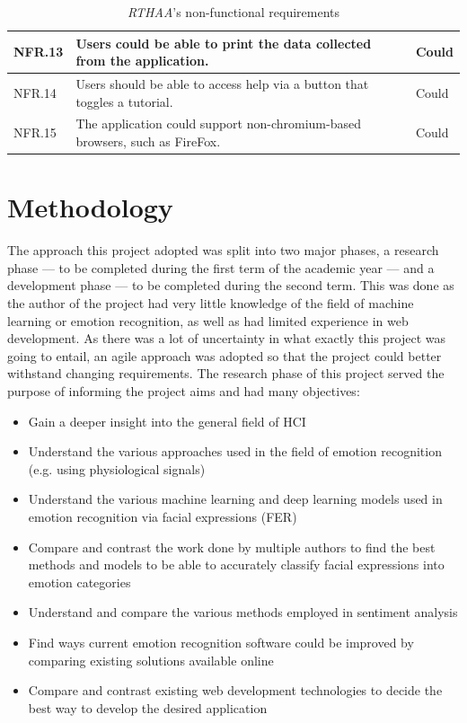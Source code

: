 \documentclass[12pt, a4paper]{article}
\begin{document}
\begin{table}[H]
\begin{tabular}{|L{3.4cm}|L{8.9cm}|L{1.8cm}|}
        \\ \hline
        NFR.13 & Users could be able to print the data collected from the application. & Could
        \\ \hline
        NFR.14 & Users should be able to access help via a button that toggles a tutorial. & Could
        \\ \hline
        NFR.15 & The application could support non-chromium-based browsers, such as FireFox. & Could
        \\ \hline
    \end{tabular}
    \caption{\textit{RTHAA}'s non-functional requirements}
    \label{tab:nfreq}
\end{table}


\clearpage
\section{Methodology}


The approach this project adopted was split into two major phases, a research phase --- to be completed during the first term of the academic year --- and a development phase --- to be completed during the second term. This was done as the author of the project had very little knowledge of the field of machine learning or emotion recognition, as well as had limited experience in web development. As there was a lot of uncertainty in what exactly this project was going to entail, an agile approach was adopted so that the project could better withstand changing requirements. The research phase of this project served the purpose of informing the project aims and had many objectives:

\begin{itemize}
    \item Gain a deeper insight into the general field of HCI
    \item Understand the various approaches used in the field of emotion recognition (e.g. using physiological signals)
    \item Understand the various machine learning and deep learning models used in emotion recognition via facial expressions (FER)
    \item Compare and contrast the work done by multiple authors to find the best methods and models to be able to accurately classify facial expressions into emotion categories
    \item Understand and compare the various methods employed in sentiment analysis 
    \item Find ways current emotion recognition software could be improved by comparing existing solutions available online
    \item Compare and contrast existing web development technologies to decide the best way to develop the desired application
\end{itemize}
\end{document}
